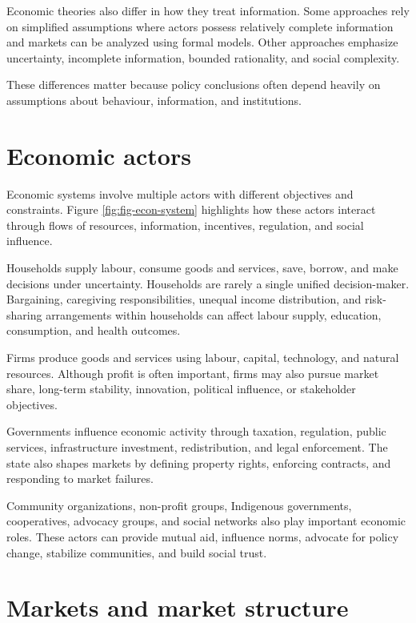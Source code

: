 \documentclass[
  11pt,
  oneside]{book}
\begin{document}
Economic theories also differ in how they treat information. Some approaches rely on simplified assumptions where actors possess relatively complete information and markets can be analyzed using formal models. Other approaches emphasize uncertainty, incomplete information, bounded rationality, and social complexity.

These differences matter because policy conclusions often depend heavily on assumptions about behaviour, information, and institutions.

\section{Economic actors}\label{economic-actors}

Economic systems involve multiple actors with different objectives and constraints. Figure \ref{fig:fig-econ-system} highlights how these actors interact through flows of resources, information, incentives, regulation, and social influence.

Households supply labour, consume goods and services, save, borrow, and make decisions under uncertainty. Households are rarely a single unified decision-maker. Bargaining, caregiving responsibilities, unequal income distribution, and risk-sharing arrangements within households can affect labour supply, education, consumption, and health outcomes.

Firms produce goods and services using labour, capital, technology, and natural resources. Although profit is often important, firms may also pursue market share, long-term stability, innovation, political influence, or stakeholder objectives.

Governments influence economic activity through taxation, regulation, public services, infrastructure investment, redistribution, and legal enforcement. The state also shapes markets by defining property rights, enforcing contracts, and responding to market failures.

Community organizations, non-profit groups, Indigenous governments, cooperatives, advocacy groups, and social networks also play important economic roles. These actors can provide mutual aid, influence norms, advocate for policy change, stabilize communities, and build social trust.

\section{Markets and market structure}\label{markets-and-market-structure}
\end{document}
